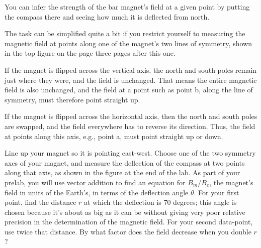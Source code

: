 \label{lab:magnetism}

\label{fig:dipbofr}

\label{fig:dipnew}

\apparatus
{}


\introduction

You can infer the strength of the bar magnet's field at a
given point by putting the compass there and seeing how
much it is deflected from north.

The task can be simplified quite a bit if you restrict
yourself to measuring the magnetic field at points along one
of the magnet's two lines of symmetry, shown in the top figure on the
page three pages after this one.


If the magnet is flipped across the vertical axis, the north
and south poles remain just where they were, and the field
is unchanged. That means the entire magnetic field is also
unchanged, and the field at a point such as point b, along
the line of symmetry, must therefore point straight up.

If the magnet is flipped across the horizontal axis, then
the north and south poles are swapped, and the field
everywhere has to reverse its direction. Thus, the field at
points along this axis, e.g., point a, must point straight up or down.

Line up your magnet so it is pointing east-west. Choose one
of the two symmetry axes of your magnet, and measure the
deflection of the compass at two points along that axis,
as shown in the figure at the end of the lab.
As part of your prelab, you will use vector addition to find an equation
for $B_m/B_e$, the magnet's field in units of the Earth's, in terms
of the deflection angle $\theta$. For your first point, find the
distance $r$ at which the deflection is 70 degrees; this angle is chosen because
it's about as big as it can be without giving very poor relative precision 
in the determination of the magnetic field. For your second data-point,
use twice that distance. By what factor does the field decrease
when you double $r$?

